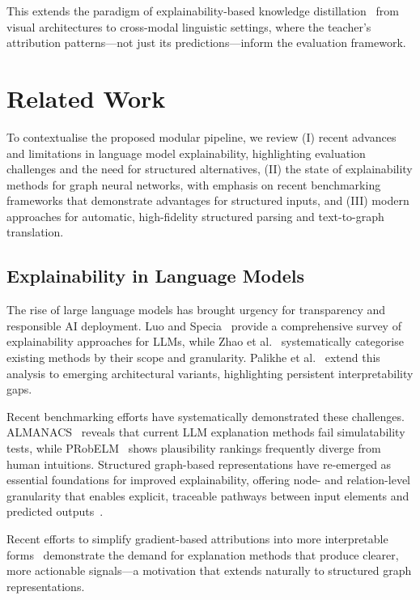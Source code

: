 \documentclass[preprint, times, review, 10pt]{elsarticle}
\begin{document}
This extends the paradigm of explainability-based knowledge distillation~\cite{sun2025expkd} from visual architectures to cross-modal linguistic settings, where the teacher's attribution patterns—not just its predictions—inform the evaluation framework.

\section{Related Work}

To contextualise the proposed modular pipeline, we review (I) recent advances and limitations in language model explainability, highlighting evaluation challenges and the need for structured alternatives, (II) the state of explainability methods for graph neural networks, with emphasis on recent benchmarking frameworks that demonstrate advantages for structured inputs, and (III) modern approaches for automatic, high-fidelity structured parsing and text-to-graph translation.

\subsection{Explainability in Language Models} \label{explainability_lm}

The rise of large language models has brought urgency for transparency and responsible AI deployment. Luo and Specia~\cite{luo2024understandingutilizationsurveyexplainability} provide a comprehensive survey of explainability approaches for LLMs, while Zhao et al.~\cite{zhao2024surveyllm-xai} systematically categorise existing methods by their scope and granularity. Palikhe et al.~\cite{palikhe2025survey-llm-xai} extend this analysis to emerging architectural variants, highlighting persistent interpretability gaps.

Recent benchmarking efforts have systematically demonstrated these challenges. ALMANACS~\cite{mills2025almanacssimulatabilitybenchmarklanguage} reveals that current LLM explanation methods fail simulatability tests, while PRobELM~\cite{yuan2025probelmplausibilityrankingevaluation} shows plausibility rankings frequently diverge from human intuitions. Structured graph-based representations have re-emerged as essential foundations for improved explainability, offering node- and relation-level granularity that enables explicit, traceable pathways between input elements and predicted outputs~\cite{palikhe2025survey-llm-xai,luo2024understandingutilizationsurveyexplainability}.


Recent efforts to simplify gradient-based attributions into more interpretable forms~\cite{rodrigues2024gad} demonstrate the demand for explanation methods that produce clearer, more actionable signals—a motivation that extends naturally to structured graph representations.
\end{document}
